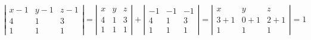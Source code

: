 \documentclass[twoside]{amsart}
\theoremstyle{plain}
\theoremstyle{definition}
\begin{document}
\begin{enumerate}
\[
\left| \begin{matrix} x - 1 & y - 1 & z - 1 \\ 4 & 1 & 3 \\ 1 & 1 & 1 \end{matrix} \right| = \left| \begin{matrix} x & y & z \\ 4 & 1 & 3 \\ 1 & 1 & 1 \end{matrix} \right| + \left| \begin{matrix} -1 & - 1 & -1 \\ 4 & 1 & 3 \\ 1 & 1 & 1 \end{matrix} \right| = \left| \begin{matrix} x & y & z \\ 3 + 1 & 0 + 1 & 2 + 1 \\ 1 & 1 & 1 \end{matrix} \right| = \boxed{ 1 } 
\]
\end{enumerate}
\end{document}

